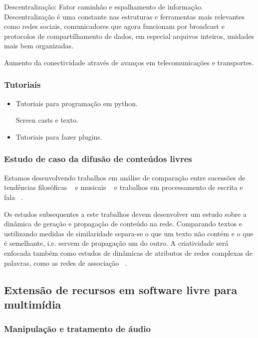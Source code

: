 Descentralização: Fator caminhão e espalhamento de informação. Descentralização
é uma constante nas estruturas e ferramentas mais relevantes como redes
sociais, comunicadores que agora funcionam por broadcast e protocolos de
compartilhamento de dados, em especial arquivos inteiros, unidades mais
bem organizadas.

Aumento da conectividade através de avanços em telecomunicações e transportes.

\subsubsection{Tutoriais}
\label{sec:uso_sl}

\begin{itemize}
    \item Tutoriais para programação em python.

Screen casts e texto.

    \item Tutoriais para fazer plugins.
\end{itemize}

\subsubsection{Estudo de caso da difusão de conteúdos livres}
\label{sec:dif_sl}

Estamos desenvolvendo trabalhos em análise de comparação
entre sucessões de tendências filosóficas ~\cite{philome} e
musicais ~\cite{musime} e trabalhos em processamento de escrita
e fala ~\cite{rede-associacoes, complenet, enfmc, ifsc}.

Os estudos subsequentes a este trabalhos devem desenvolver
um estudo sobre a dinâmica de geração e propagação de conteúdo na rede.
Comparando textos e ustilizando medidas de similaridade separa-se
o que um texto não contém e o que é semelhante, i.e. servem de propagação
um do outro. A criatividade será enfocada também como estudos de dinâmicas
de atributos de redes complexas de palavras, como as redes de associação ~\cite{rede-associacoes}.


\subsection{Extensão de recursos em software livre para multimídia}
\label{sec:extensao}

\subsubsection{Manipulação e tratamento de áudio}
\label{sec:manip-audio}


